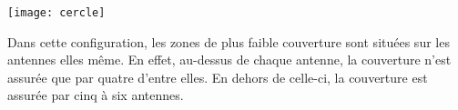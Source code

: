 \begin{minipage}{0.45\linewidth}
  \centering
  \texttt{[image: cercle]}
\end{minipage}
\begin{minipage}{0.45\linewidth}
  Dans cette configuration, les zones de plus faible couverture
sont situées sur les antennes elles même. En effet, au-dessus
de chaque antenne, la couverture n’est assurée que par
quatre d’entre elles. En dehors de celle-ci, la couverture est
assurée par cinq à six antennes.
\end{minipage}




